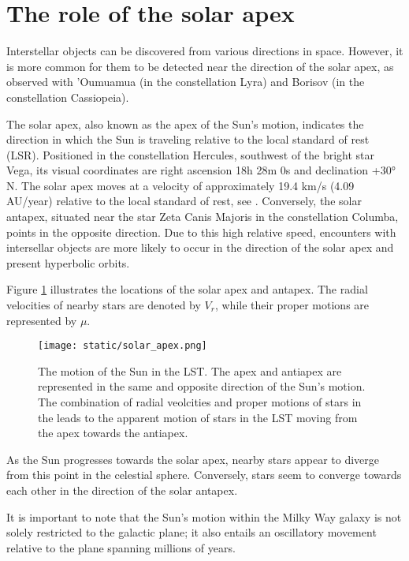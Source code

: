 \section{The role of the solar apex}


Interstellar objects can be discovered from various directions in space.
However, it is more common for them to be detected near the direction of the
solar apex, as observed with 'Oumuamua (in the constellation Lyra) and Borisov
(in the constellation Cassiopeia).

The solar apex, also known as the apex of the Sun's motion, indicates the
direction in which the Sun is traveling relative to the local standard of rest
(LSR). Positioned in the constellation Hercules, southwest of the bright star
Vega, its visual coordinates are right ascension 18h 28m 0s and declination +30°
N. The solar apex moves at a velocity of approximately 19.4 km/s (4.09 AU/year)
relative to the local standard of rest, see \cite{dehnen1998}. Conversely, the
solar antapex, situated near the star Zeta Canis Majoris in the constellation
Columba, points in the opposite direction. Due to this high relative speed,
encounters with intersellar objects are more likely to occur in the direction of
the solar apex and present hyperbolic orbits.

Figure \ref{fig:solar_apex} illustrates the locations of the solar apex and
antapex. The radial velocities of nearby stars are denoted by $V_r$, while their
proper motions are represented by $\mu$.

\begin{figure}[H]
  \centering
  \texttt{[image: static/solar\_apex.png]}
  \caption[The motion of the Sun in the LST.]
  {
    The motion of the Sun in the LST. The apex and antiapex are
    represented in the same and opposite direction of the Sun's motion.
    The combination of radial veolcities and proper motions of stars in the
    leads to the apparent motion of stars in the LST moving from the apex
    towards the antiapex.
  }
  \label{fig:solar_apex}
\end{figure}

As the Sun progresses towards the solar apex, nearby stars appear to diverge
from this point in the celestial sphere. Conversely, stars seem to converge
towards each other in the direction of the solar antapex.

It is important to note that the Sun's motion within the Milky Way galaxy is not
solely restricted to the galactic plane; it also entails an oscillatory movement
relative to the plane spanning millions of years.

